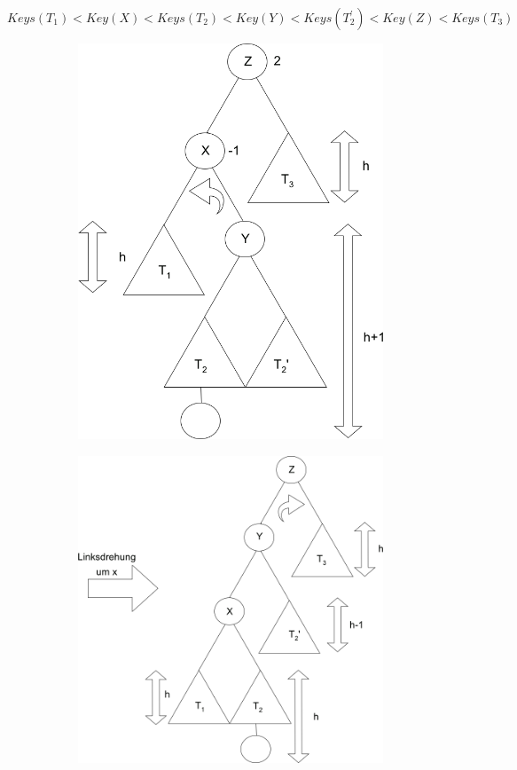 $Keys(T_1) < Key(X) < Keys(T_2) < Key(Y) < Keys(T_2^{'}) < Key(Z) < Keys(T_3)$

\begin{figure}
	\begin{subfigure}[H]{0.3\textwidth}
		\includegraphics[width=\linewidth]{11/Grafik/img5_doppelRotation_2.png}
	\end{subfigure}
	\begin{subfigure}[H]{0.3\textwidth}
			\includegraphics[width=\linewidth]{11/Grafik/img6_doppelRotation_3.png}

\end{subfigure}
\end{figure}
